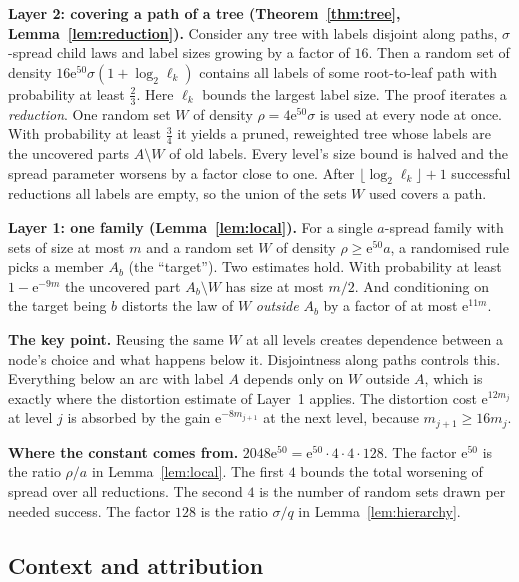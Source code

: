 \documentclass[11pt]{article}
\numberwithin{equation}{section}
\newcommand{\ee}{\mathrm e}
\begin{document}
\smallskip\noindent\textbf{Layer 2: covering a path of a tree
(Theorem~\ref{thm:tree}, Lemma~\ref{lem:reduction}).}
Consider any tree with labels disjoint along paths, $\sigma$-spread
child laws and label sizes growing by a factor of $16$. Then a random
set of density $16\ee^{50}\sigma(1+\log_2\ell_k)$ contains all labels of
some root-to-leaf path with probability at least $\frac23$. Here
$\ell_k$ bounds the largest label size. The proof iterates a
\emph{reduction}. One random set $W$ of density $\rho=4\ee^{50}\sigma$
is used at every node at once. With probability at least $\frac34$ it
yields a pruned, reweighted tree whose labels are the uncovered parts
$A\setminus W$ of old labels. Every level's size bound is halved and
the spread parameter worsens by a factor close to one. After
$\lfloor\log_2\ell_k\rfloor+1$ successful reductions all labels are
empty, so the union of the sets $W$ used covers a path.

\smallskip\noindent\textbf{Layer 1: one family (Lemma~\ref{lem:local}).}
For a single $a$-spread family with sets of size at most $m$ and a
random set $W$ of density $\rho\ge\ee^{50}a$, a randomised rule picks a
member $A_b$ (the ``target''). Two estimates hold. With probability at
least $1-\ee^{-9m}$ the uncovered part $A_b\setminus W$ has size at most
$m/2$. And conditioning on the target being $b$ distorts the law of $W$
\emph{outside} $A_b$ by a factor of at most $\ee^{11m}$.

\smallskip\noindent\textbf{The key point.}
Reusing the same $W$ at all levels creates dependence between a node's
choice and what happens below it. Disjointness along paths controls
this. Everything below an arc with label $A$ depends only on $W$
outside $A$, which is exactly where the distortion estimate of Layer~1
applies. The distortion cost $\ee^{12m_j}$ at level $j$ is absorbed by
the gain $\ee^{-8m_{j+1}}$ at the next level, because
$m_{j+1}\ge16m_j$.

\smallskip\noindent\textbf{Where the constant comes from.}
$2048\ee^{50}=\ee^{50}\cdot4\cdot4\cdot128$. The factor $\ee^{50}$ is
the ratio $\rho/a$ in Lemma~\ref{lem:local}. The first $4$ bounds the
total worsening of spread over all reductions. The second $4$ is the
number of random sets drawn per needed success. The factor $128$ is the
ratio $\sigma/q$ in Lemma~\ref{lem:hierarchy}.

\subsection{Context and attribution}
\end{document}
